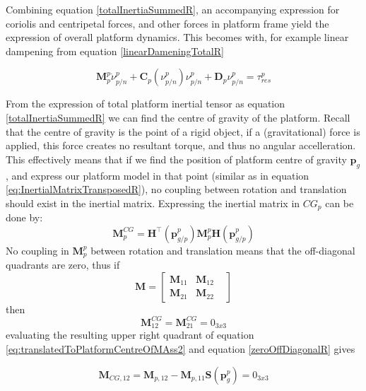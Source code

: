 Combining equation \ref{totalInertiaSummedR}, an accompanying expression for coriolis and centripetal forces, and other forces in platform frame yield the expression of overall platform dynamics. This becomes with, for example linear dampening from equation \ref{linearDameningTotalR}

\begin{equation}
	\textbf{M}_{p}^{p}  \dot{\nu}_{p/n}^{p} + \textbf{C}_{p}(\nu_{p/n}^{p})\nu_{p/n}^{p} + \textbf{D}_{p} \nu_{p/n}^{p}  = \tau_{res}^{p}
	\label{eq:mainmodelfullR}
\end{equation}

From the expression of total platform inertial tensor as equation \ref{totalInertiaSummedR} we can find the centre of gravity of the platform. Recall that the centre of gravity is the point of a rigid object, if a (gravitational) force is applied, this force creates no resultant torque, and thus no angular accelleration. 
This effectively means that if we find the position of platform centre of gravity $\textbf{p}_{g}$, and express our platform model in that point (similar as in equation \ref{eq:InertialMatrixTransposedR}), no coupling between rotation and translation should exist in the inertial matrix. Expressing the inertial matrix in $CG_{p}$ can be done by:
\begin{equation}
	\textbf{M}_{p}^{CG} =  \textbf{H}^{\top}(\textbf{p}_{g/p}^{p})  \textbf{M}_{p}^{p} \textbf{H}(\textbf{p}_{g/p}^{p})
	\label{eq:translatedToPlatformCentreOfMAss2}
\end{equation}
No coupling in $\textbf{M}_{p}^{p}$ between rotation and translation means that the off-diagonal quadrants are zero, thus if
\begin{equation}
	\textbf{M} =  \begin{bmatrix}
		\textbf{M}_{11} & \textbf{M}_{12} \\ \textbf{M}_{21} & \textbf{M}_{22} &
	\end{bmatrix}
\end{equation}
then 
\begin{equation}
	\textbf{M}_{12}^{CG} = \textbf{M}_{21}^{CG} = 0_{3x3}
	\label{zeroOffDiagonalR}
\end{equation}
evaluating the resulting upper right quadrant of equation \ref{eq:translatedToPlatformCentreOfMAss2} and equation \ref{zeroOffDiagonalR} gives

\begin{equation}
	\textbf{M}_{CG,12} = \textbf{M}_{p,12} - \textbf{M}_{p,11} \textbf{S}(\textbf{p}_{g}^{p}) = 0_{3x3} 
\end{equation}

